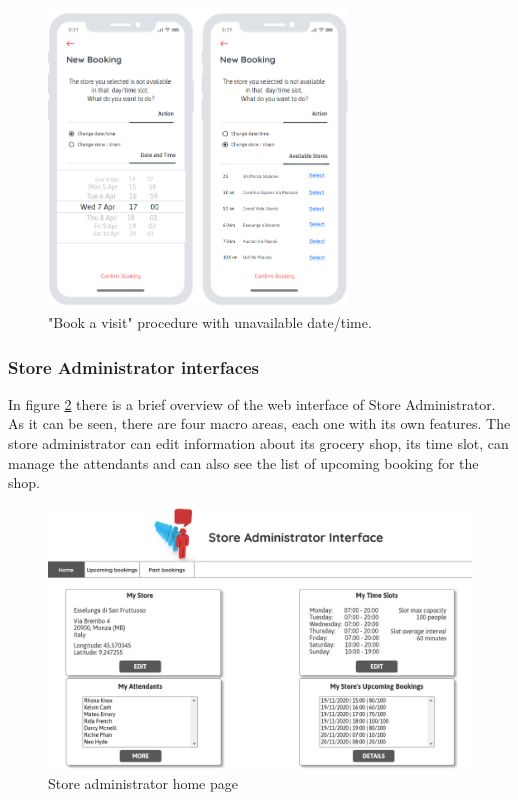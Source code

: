 \documentclass[table, 12pt]{article}
\begin{document}
\begin{figure}[H]
    \begin{center}
        \includegraphics[width=225pt]{assets/mock_new_booking_unavailable.png}
        \caption{"Book a visit" procedure with unavailable date/time.}
        \label{mock_new_booking_unavailable}
    \end{center}
\end{figure}

\subsubsection{Store Administrator interfaces}
In figure \ref{mock_store_admin_home} there is a brief overview of the web interface of Store Administrator.
As it can be seen, there are four macro areas, each one with its own features.
The store administrator can edit information about its grocery shop, its time slot, can manage the attendants and can also see the list of upcoming booking for the shop.
\begin{figure}[H]
    \includegraphics[width=\textwidth]{assets/mock_home_store_admin.png}
    \caption{Store administrator home page}
    \label{mock_store_admin_home}
\end{figure}
\end{document}
